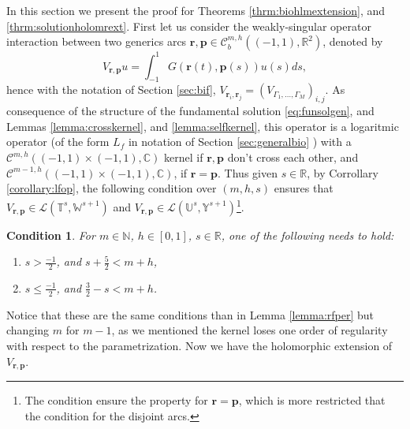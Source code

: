 \documentclass{article}
\newtheorem{condition}[theorem]{Condition}
\newcommand{\IC}{{\mathbb C}}
\newcommand{\IN}{{\mathbb N}}
\newcommand{\IR}{{\mathbb R}}
\newcommand{\IU}{{\mathbb U}}
\newcommand{\IT}{{\mathbb T}}
\newcommand{\IW}{{\mathbb W}}
\newcommand{\IY}{{\mathbb Y}}
\newcommand{\bp}{{\bm p}}
\newcommand{\cmspaceh}[4]{\mathcal{C}^{#1,#2} \left( #3, #4 \right)}
\newcommand{\rgeoh}[2]{\mathcal{C}_b^{#1,#2}\left( (-1,1), \IR^2 \right)}
\newcommand{\br}{\bm{r}}
\newcommand{\iinterv}{(-1,1)\times(-1,1)}
\begin{document}
In this section we present the proof for Theorems \ref{thrm:biohlmextension}, and \ref{thrm:solutionholomrext}. First let us consider the weakly-singular operator interaction between two generics arcs $\br,\bp \in \rgeoh{m}{h}$, denoted by 
$$V_{\br,\bp}u  = \int_{-1}^1G(\br(t),\bp(s)) u(s) ds,$$
hence with the notation of Section \ref{sec:bif}, $V_{\br_i, \br_j} = (V_{\Gamma_1,\hdots,\Gamma_M})_{i,j}$. As consequence of the structure of the fundamental solution \eqref{eq:funsolgen}, and Lemmas \ref{lemma:crosskernel}, and \ref{lemma:selfkernel}, this operator is a logaritmic operator (of the form $L_f$ in notation of Section \ref{sec:generalbio} ) with a $\cmspaceh{m}{h}{\iinterv}{\IC}$ kernel if $\br ,\bp$ don't cross each other, and $\cmspaceh{m-1}{h}{\iinterv}{\IC}$, if $\br = \bp$. Thus given $s \in \IR$,   by Corrollary \ref{corollary:lfop}, the following condition over $(m,h,s)$ ensures that $V_{\br,\bp} \in \mathcal{L}\left(\IT^s,\IW^{s+1}\right)$ and $V_{\br,\bp} \in \mathcal{L}\left(\IU^s,\IY^{s+1}\right)$\footnote{The condition ensure the property for $\br = \bp$, which is more restricted that the condition for the disjoint arcs.}.
\begin{condition}
\label{condition:smh}
For $m \in \IN$, $h \in [0,1]$, $s \in \IR$, one of the following needs to hold:
\begin{enumerate}
\item[i] 
$s > \frac{-1}{2}$, and $s+
\frac{5}{2}<m+h$,
\item[ii] 
$ s \leq \frac{-1}{2}$, and $\frac{3}{2} -s < m+h$.
\end{enumerate}
\end{condition}
Notice that these are the same conditions than in Lemma \ref{lemma:rfper} but changing $m$ for $m-1$, as we mentioned the kernel loses one order of regularity with respect to the parametrization.  Now we have the holomorphic extension of $V_{\br,\bp}$.
\end{document}
